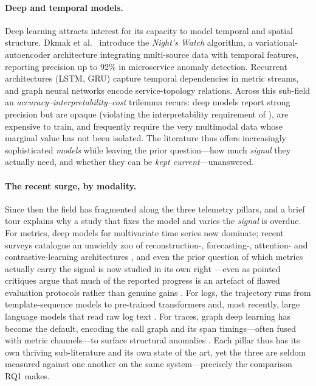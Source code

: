 \documentclass[acmsmall]{acmart}
\begin{document}
\paragraph{Deep and temporal models.} Deep learning attracts interest for its capacity to model temporal and spatial structure. Dkmak et al.\ \cite{dkmak2025} introduce the \emph{Night's Watch} algorithm, a variational-autoencoder architecture integrating multi-source data with temporal features, reporting precision up to 92\% in microservice anomaly detection. Recurrent architectures (LSTM, GRU) capture temporal dependencies in metric streams, and graph neural networks encode service-topology relations. Across this sub-field an \emph{accuracy--interpretability--cost} trilemma recurs: deep models report strong precision but are opaque (violating the interpretability requirement of \cite{raeiszadeh2026}), are expensive to train, and frequently require the very multimodal data whose marginal value has not been isolated. The literature thus offers increasingly sophisticated \emph{models} while leaving the prior question---how much \emph{signal} they actually need, and whether they can be \emph{kept current}---unanswered.

\paragraph{The recent surge, by modality.} Since then the field has fragmented along the three telemetry pillars, and a brief tour explains why a study that fixes the model and varies the \emph{signal} is overdue. For metrics, deep models for multivariate time series now dominate; recent surveys catalogue an unwieldy zoo of reconstruction-, forecasting-, attention- and contrastive-learning architectures \cite{wang2025mtssurvey,xia2024coupled,choi2024selfsup}, and even the prior question of which metrics actually carry the signal is now studied in its own right \cite{singal2025metric}---even as pointed critiques argue that much of the reported progress is an artefact of flawed evaluation protocols rather than genuine gains \cite{sarfraz2024quovadis,wagner2025metrics}. For logs, the trajectory runs from template-sequence models to pre-trained transformers and, most recently, large language models that read raw log text \cite{landauer2022logsurvey,guan2024logllm,pospieszny2025adalog}. For traces, graph deep learning has become the default, encoding the call graph and its span timings---often fused with metric channels---to surface structural anomalies \cite{chen2023tracegra,akmeemana2025galmad,zhang2025graphneural,alomari2025context}. Each pillar thus has its own thriving sub-literature and its own state of the art, yet the three are seldom measured against one another on the same system---precisely the comparison RQ1 makes.
\end{document}

